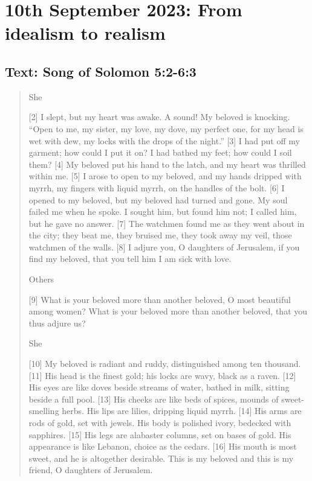\setcounter{figure}{0}

\section{10th September 2023: From idealism to realism}
\subsection*{Text: Song of Solomon 5:2-6:3}
  \begin{quote}
    She

    [2] I slept, but my heart was awake.
    A sound! My beloved is knocking.
    “Open to me, my sister, my love,
        my dove, my perfect one,
    for my head is wet with dew,
        my locks with the drops of the night.”
    [3] I had put off my garment;
        how could I put it on?
    I had bathed my feet;
        how could I soil them?
    [4] My beloved put his hand to the latch,
        and my heart was thrilled within me.
    [5] I arose to open to my beloved,
        and my hands dripped with myrrh,
    my fingers with liquid myrrh,
        on the handles of the bolt.
    [6] I opened to my beloved,
        but my beloved had turned and gone.
    My soul failed me when he spoke.
    I sought him, but found him not;
        I called him, but he gave no answer.
    [7] The watchmen found me
        as they went about in the city;
    they beat me, they bruised me,
        they took away my veil,
        those watchmen of the walls.
    [8] I adjure you, O daughters of Jerusalem,
        if you find my beloved,
    that you tell him
        I am sick with love.


    Others

    [9] What is your beloved more than another beloved,
        O most beautiful among women?
    What is your beloved more than another beloved,
        that you thus adjure us?


        She

    [10] My beloved is radiant and ruddy,
        distinguished among ten thousand.
    [11] His head is the finest gold;
        his locks are wavy,
        black as a raven.
    [12] His eyes are like doves
        beside streams of water,
    bathed in milk,
        sitting beside a full pool.
    [13] His cheeks are like beds of spices,
        mounds of sweet-smelling herbs.
    His lips are lilies,
        dripping liquid myrrh.
    [14] His arms are rods of gold,
        set with jewels.
    His body is polished ivory,
        bedecked with sapphires.
    [15] His legs are alabaster columns,
        set on bases of gold.
    His appearance is like Lebanon,
        choice as the cedars.
    [16] His mouth is most sweet,
        and he is altogether desirable.
    This is my beloved and this is my friend,
        O daughters of Jerusalem.



\end{quote}
